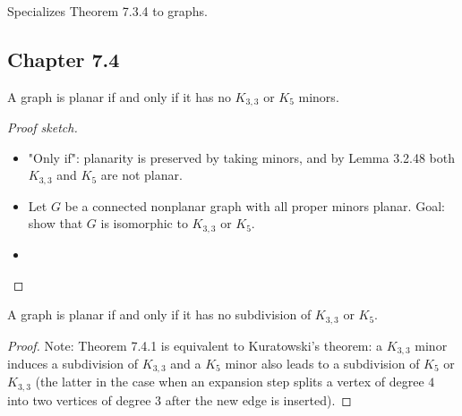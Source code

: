 \begin{corollary}[7.3.5]
  \label{cor:7.3.5}
  Specializes Theorem 7.3.4 to graphs.
\end{corollary}


\subsection{Chapter 7.4}

\begin{theorem}
  \label{thm:7.4.1}
  A graph is planar if and only if it has no $K_{3,3}$ or $K_{5}$ minors.
\end{theorem}

\begin{proof}[Proof sketch]
  \begin{itemize}
    \item "Only if": planarity is preserved by taking minors, and by Lemma 3.2.48 both $K_{3,3}$ and $K_{5}$ are not planar.
    \item Let $G$ be a connected nonplanar graph with all proper minors planar. Goal: show that $G$ is isomorphic to $K_{3,3}$ or $K_{5}$.
    \item
  \end{itemize}
\end{proof}

\begin{theorem}[Kuratowski]
  \label{thm:Kuratowski}
  A graph is planar if and only if it has no subdivision of $K_{3,3}$ or $K_{5}$.
\end{theorem}

\begin{proof}
  Note: Theorem 7.4.1 is equivalent to Kuratowski's theorem: a $K_{3,3}$ minor induces a subdivision of $K_{3,3}$ and a $K_{5}$ minor also leads to a subdivision of $K_{5}$ or $K_{3,3}$ (the latter in the case when an expansion step splits a vertex of degree $4$ into two vertices of degree $3$ after the new edge is inserted).
\end{proof}
